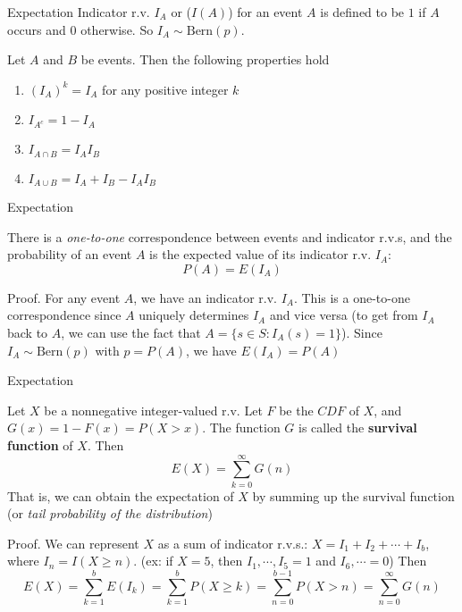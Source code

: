 \documentclass[8pt]{beamer}
\newcommand{\tb}[1]{\textbf{#1}}
\newcommand{\ti}[1]{\textit{#1}}
\begin{document}
\begin{frame}{Expectation}
    Indicator r.v.  $I_A$ or ($I(A)$) for an event $A$ is defined to be $1$ if $A$ occurs and $0$ otherwise. So $I_A \sim \text{Bern}(p)$. 
    \begin{theorem}
        Let $A$ and $B$ be events. Then the following properties hold
        \begin{enumerate}
            \item $(I_A)^k = I_A$ for any positive integer $k$
            \item $I_{A^c} = 1 - I_A$
            \item $I_{A \cap B} = I_A I_B$
            \item $I_{A \cup B} = I_A + I_B - I_A I_B$
        \end{enumerate}
    \end{theorem}
\end{frame}

\begin{frame}{Expectation}
    \begin{theorem}
        There is a \ti{one-to-one} correspondence between events and indicator r.v.s, and the probability of an event $A$ is the expected value of its indicator r.v. $I_A$: 
        \[
        P(A) = E(I_A)
        \]
    \end{theorem}

    Proof. For any event $A$, we have an indicator r.v. $I_A$. This is a one-to-one correspondence since $A$ uniquely determines $I_A$ and vice versa (to get from $I_A$ back to $A$, we can use the fact that $A = \{s \in S: I_A(s) = 1\}$). Since $I_A \sim \text{Bern}(p)$ with $p = P(A)$, we have $E(I_A) = P(A)$
\end{frame}

\begin{frame}{Expectation}
    \begin{theorem} \label{thm:expectation_via_survival_function}
        Let $X$ be a nonnegative integer-valued r.v. Let $F$ be the $CDF$ of $X$, and $G(x)=1-F(x)=P(X>x)$. The function $G$ is called the \tb{survival function} of $X$. Then
        \[
            E(X) = \sum^\infty_{k=0} G(n)
        \]
        That is, we can obtain the expectation of $X$ by summing up the survival function (or \ti{tail probability of the distribution})
    \end{theorem}
    Proof. We can represent $X$ as a sum of indicator r.v.s.: $X = I_1 + I_2 + \cdots + I_b$, where $I_n = I(X \geq n)$. (ex: if $X=5$, then $I_1, \cdots, I_5 = 1$ and $I_6, \cdots = 0$) Then
    \[
        E(X) = \sum^b_{k=1} E(I_k) = \sum^b_{k=1} P(X \geq k ) = \sum^{b-1}_{n=0} P(X > n) = \sum^\infty_{n=0} G(n)
    \]
\end{frame}
\end{document}
